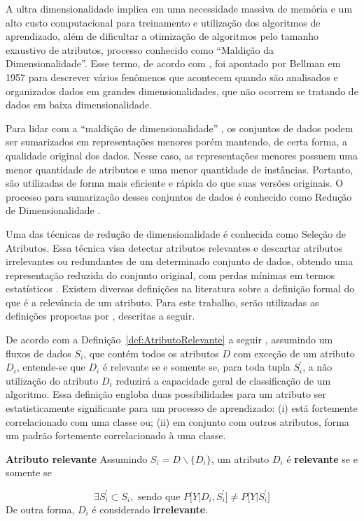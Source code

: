 A ultra dimensionalidade implica em uma necessidade massiva de memória e um alto custo computacional para treinamento e utilização dos algoritmos de aprendizado, além de dificultar a otimização de algoritmos pelo tamanho exaustivo de atributos, processo conhecido como ``Maldição da Dimensionalidade''. Esse termo, de acordo com , foi apontado por Bellman em 1957 para descrever vários fenômenos que acontecem quando são analisados e organizados dados em grandes dimensionalidades, que não ocorrem se tratando de dados em baixa dimensionalidade. 

Para lidar com 
a ``maldição de dimensionalidade''
, os conjuntos de dados podem ser sumarizados em representações menores porém mantendo, de certa forma, a qualidade original dos dados. Nesse caso, as representações menores possuem uma menor quantidade de atributos e uma menor quantidade de instâncias. Portanto, são utilizadas de forma mais eficiente e rápida do que suas versões originais. O processo para sumarização desses conjuntos de dados é conhecido como Redução de Dimensionalidade \cite{Bolon-Canedo2015}.

Uma das técnicas de redução de dimensionalidade é conhecida como Seleção de Atributos. Essa técnica visa detectar atributos relevantes e descartar atributos irrelevantes ou redundantes de um determinado conjunto de dados, obtendo uma representação reduzida do conjunto original, com perdas mínimas em termos estatísticos \cite{Han2006}. Existem diversas definições na literatura sobre a definição formal do que é a relevância de um atributo. Para este trabalho, serão utilizadas as definições propostas por , descritas a seguir.


De acordo com a Definição~\ref{def:AtributoRelevante} 
a seguir
, assumindo um fluxos de dados $S_i$, que contém todos os atributos $D$ com exceção de um atributo $D_i$, entende-se que $D_i$ é relevante se e somente se, para toda tupla $S_i^{'}$, a não utilização do atributo $D_i$  reduzirá a capacidade geral de classificação de um algoritmo. Essa definição engloba duas possibilidades para um atributo ser estatisticamente significante para um processo de aprendizado: (i) está fortemente correlacionado com uma classe ou; (ii) em conjunto com outros atributos, forma um padrão fortemente correlacionado à uma classe.


\theoremstyle{definition}
\begin{definition}{\textbf{Atributo relevante}}\label{def:AtributoRelevante}
Assumindo $S_i = D\backslash \{D_i\}$, um atributo $D_i$ é \textbf{relevante} se e somente se

\begin{equation}
\exists S_i^{'} \subset S_i, \text{ sendo que } P\big[Y \vert D_i, S_i^{'}\big]\neq P\big[Y \vert S_i^{'}\big]
\end{equation}
De outra forma, $D_i$ é considerado \textbf{irrelevante}.
\end{definition}



